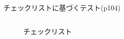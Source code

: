 \begin{frame}[shrink=15]{チェックリストに基づくテスト(p104)}
\begin{columns}[t]
\begin{column}{.35\textwidth}
        \begin{figure}
        \begin{center}
            \begin{overlayarea}{\textwidth}{0.6\textheight}
            \begin{center}
            \end{center}
            \end{overlayarea}
        \caption{チェックリスト}
        \end{center}
        \end{figure}
    \end{column}
\end{columns}
\end{frame}
